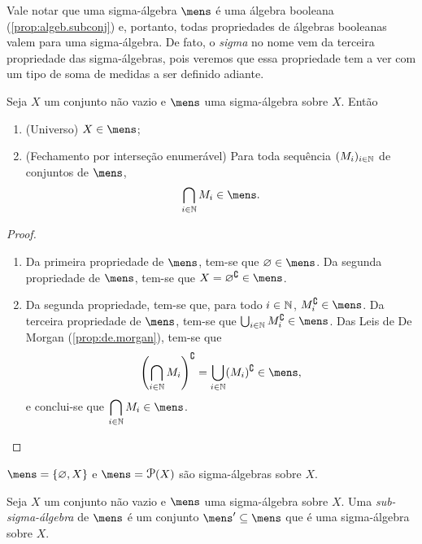 	Vale notar que uma sigma-álgebra $\mens$ é uma álgebra booleana (\ref{prop:algeb.subconj}) e, portanto, todas propriedades de álgebras booleanas valem para uma sigma-álgebra. De fato, o \textit{sigma} no nome vem da terceira propriedade das sigma-álgebras, pois veremos que essa propriedade tem a ver com um tipo de soma de medidas a ser definido adiante.

\begin{prop}
	Seja $X$ um conjunto não vazio e $\mens$ uma sigma-álgebra sobre $X$. Então
	\begin{enumerate}
	\item (Universo) $X \in \mens$;
	\item (Fechamento por interseção enumerável) Para toda sequência $(M_i)_{i \in \mathbb{N}}$ de conjuntos de $\mens$,
	\begin{equation*}
	\bigcap_{i \in \N} M_i \in \mens.
	\end{equation*}
	\end{enumerate}
\end{prop}
\begin{proof}
	\begin{enumerate}
	\item Da primeira propriedade de $\mens$, tem-se que $\emptyset \in \mens$. Da segunda propriedade de $\mens$, tem-se que $X = \emptyset^\complement \in \mens$.
	\item Da segunda propriedade, tem-se que, para todo $i \in \mathbb{N}$, $M_i^\complement \in \mens$. Da terceira propriedade de $\mens$, tem-se que $\bigcup_{i \in \N} M_i^\complement \in \mens$. Das Leis de De Morgan (\ref{prop:de.morgan}), tem-se que
	\begin{equation*}
	\left(\bigcap_{i \in \N} M_i \right)^\complement = \bigcup_{i \in \N} (M_i)^\complement \in \mens,
	\end{equation*}
e conclui-se que $\displaystyle\bigcap_{i \in \N} M_i \in \mens$.
	\end{enumerate}
\end{proof}

\begin{ex}
	$\mens = \{\emptyset,X\}$ e $\mens = \p(X)$ são sigma-álgebras sobre $X$.
\end{ex}

\begin{defi}
Seja $X$ um conjunto não vazio e $\mens$ uma sigma-álgebra sobre $X$. Uma \emph{sub-sigma-álgebra} de $\mens$ é um conjunto $\mens' \subseteq \mens$ que é uma sigma-álgebra sobre $X$.
\end{defi}


